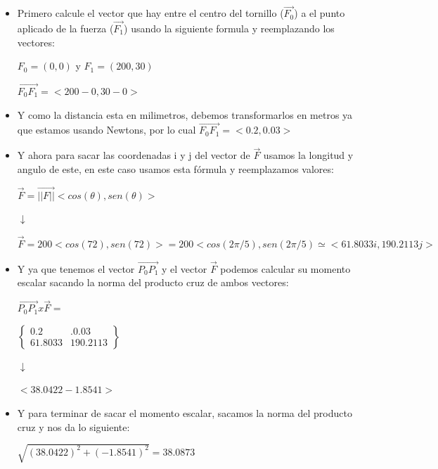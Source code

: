 \documentclass[11pt,letterpaper]{article}
\begin{document}
\begin{itemize}
    
    \item Primero calcule el vector que hay entre el centro del tornillo ($\vec{F_0}$) a el punto aplicado de la fuerza ($\vec{F_1}$) usando la siguiente formula y reemplazando los vectores:
    \begin{center}
        $F_0 = (0,0)$ y $F_1 = (200, 30)$
        
        $\vec{F_0 F_1} = <200 - 0, 30 - 0>$
    \end{center}
    \item Y como la distancia esta en milimetros, debemos transformarlos en metros ya que estamos usando Newtons, por lo cual $\vec{F_0 F_1} = <0.2, 0.03>$
    \item Y ahora para sacar las coordenadas i y j del vector de $\vec{F}$ usamos la longitud y angulo de este, en este caso usamos esta fórmula y reemplazamos valores:
    \begin{center}
        $\vec{F} = \vec{||F||}<cos(\theta), sen(\theta)>$
        
        $\downarrow$
    
        $\vec{F} = 200<cos(72), sen(72)> = 200<cos(2\pi/5), sen(2\pi/5) \simeq <61.8033 i, 190.2113 j>$ 
        
    \end{center}
    \item Y ya que tenemos el vector $\vec{P_0 P_1}$ y el vector $\vec{F}$ podemos calcular su momento escalar sacando la norma del producto cruz de ambos vectores:
    \begin{center}
        $\vec{P_0 P_1} x \vec{F} = $
        
        $\begin{Bmatrix}
            0.2 & .0.03\\
            61.8033 & 190.2113
        \end{Bmatrix}$
        
    
        $\downarrow$
    
        $<38.0422 - 1.8541> $    
    \end{center}
    \item Y para terminar de sacar el momento escalar, sacamos la norma del producto cruz y nos da lo siguiente:
    \begin{center}
        $\sqrt{(38.0422)^{2} + (-1.8541)^{2}} = 38.0873 $
    \end{center}
\end{itemize}
\end{document}
